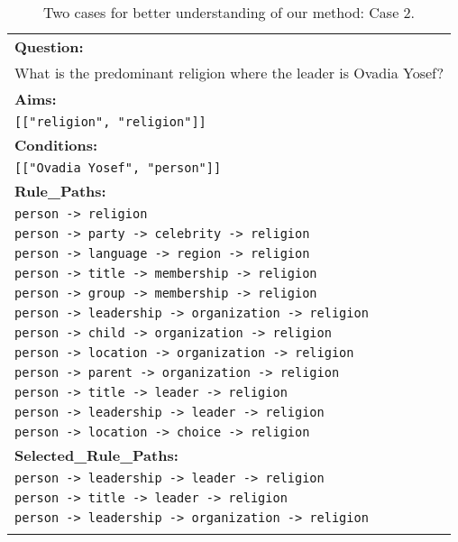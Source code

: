 \newpage
\begin{table}[htbp]
    \centering
    \caption{Two cases for better understanding of our method: Case 2.}
    \label{table:case2}
    \begin{tabular}{p{15cm}}
        \toprule
        
        \textbf{Question:} \\
        What is the predominant religion where the leader is Ovadia Yosef? \\
        \vspace{2mm} %
        \textbf{Aims:} \\
        \texttt{[["religion", "religion"]]} \\
        \vspace{2mm} %
        \textbf{Conditions:} \\
        \texttt{[["Ovadia Yosef", "person"]]} \\
        \vspace{2mm} %

        \textbf{Rule\_Paths:} \\
        \texttt{person -> religion} \\
        \texttt{person -> party -> celebrity -> religion} \\
        \texttt{person -> language -> region -> religion} \\
        \texttt{person -> title -> membership -> religion} \\
        \texttt{person -> group -> membership -> religion} \\
        \texttt{person -> leadership -> organization -> religion} \\
        \texttt{person -> child -> organization -> religion} \\
        \texttt{person -> location -> organization -> religion} \\
        \texttt{person -> parent -> organization -> religion} \\
        \texttt{person -> title -> leader -> religion} \\
        \texttt{person -> leadership -> leader -> religion} \\
        \texttt{person -> location -> choice -> religion} \\
        \vspace{2mm} %
        \textbf{Selected\_Rule\_Paths:} \\
        \texttt{person -> leadership -> leader -> religion} \\
        \texttt{person -> title -> leader -> religion} \\
        \texttt{person -> leadership -> organization -> religion} \\
        \vspace{2mm} %


\end{tabular}
\end{table}
